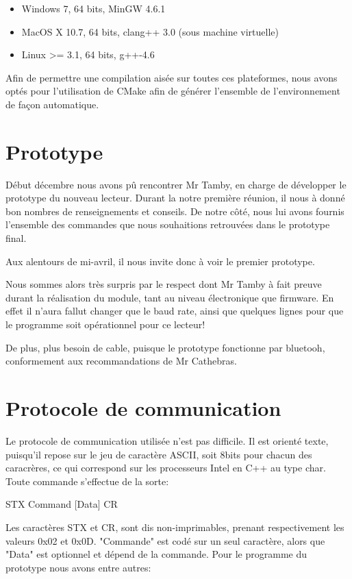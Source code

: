     \begin{itemize}
        \item Windows 7, 64 bits, MinGW 4.6.1
        \item MacOS X 10.7, 64 bits, clang++ 3.0 (sous machine virtuelle)
        \item Linux >= 3.1, 64 bits, g++-4.6
    \end{itemize}

    Afin de permettre une compilation aisée sur toutes ces plateformes, nous avons
optés pour l'utilisation de CMake afin de générer l'ensemble de l'environnement de
façon automatique.



\section{Prototype}
    Début décembre nous avons pû rencontrer Mr Tamby, en charge de développer le
prototype du nouveau lecteur. Durant la notre première réunion, il nous à donné
bon nombres de renseignements et conseils. De notre côté, nous lui avons fournis
l'ensemble des commandes que nous souhaitions retrouvées dans le prototype final.

    Aux alentours de mi-avril, il nous invite donc à voir le premier prototype.


    Nous sommes alors très surpris par le respect dont Mr Tamby à fait preuve
durant la réalisation du module, tant au niveau électronique que firmware.
En effet il n'aura fallut changer que le baud rate, ainsi que quelques lignes
pour que le programme soit opérationnel pour ce lecteur!

    De plus, plus besoin de cable, puisque le prototype fonctionne par bluetooh,
conformement aux recommandations de Mr Cathebras.



\section{Protocole de communication}
    Le protocole de communication utilisée n'est pas difficile. Il est orienté 
texte, puisqu'il repose sur le jeu de caractère ASCII, soit 8bits pour chacun des
caracrères, ce qui correspond sur les processeurs Intel en C++ au type char. 
Toute commande s'effectue de la sorte:

STX Command [Data] CR

    Les caractères STX et CR, sont dis non-imprimables, prenant respectivement les
valeurs 0x02 et 0x0D. "Commande" est codé sur un seul caractère, alors que "Data"
est optionnel et dépend de la commande. Pour le programme du prototype nous avons
entre autres:

